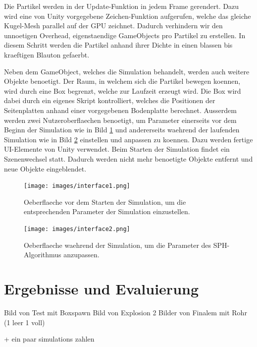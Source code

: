 \documentclass[a4paper]{paper}
\begin{document}
Die Partikel werden in der Update-Funktion in jedem Frame gerendert. Dazu wird eine von Unity vorgegebene Zeichen-Funktion aufgerufen, welche das gleiche Kugel-Mesh parallel auf der GPU zeichnet. Dadurch verhindern wir den unnoetigen Overhead, eigenstaendige GameObjects pro Partikel zu erstellen. In diesem Schritt werden die Partikel anhand ihrer Dichte in einen blassen bis kraeftigen Blauton gefaerbt.

Neben dem GameObject, welches die Simulation behandelt, werden auch weitere Objekte benoetigt. Der Raum, in welchem sich die Partikel bewegen koennen, wird durch eine Box begrenzt, welche zur Laufzeit erzeugt wird. Die Box wird dabei durch ein eigenes Skript kontrolliert, welches die Positionen der Seitenplatten anhand einer vorgegebenen Bodenplatte berechnet.
Ausserdem werden zwei Nutzeroberflaechen benoetigt, um Parameter einerseits vor dem Beginn der Simulation wie in Bild \ref{fig:interface1} und andererseits waehrend der laufenden Simulation wie in Bild \ref{fig:interface2} einstellen und anpassen zu koennen. Dazu werden fertige UI-Elemente von Unity verwendet. Beim Starten der Simulation findet ein Szenenwechsel statt. Dadurch werden nicht mehr benoetigte Objekte entfernt und neue Objekte eingeblendet.

\begin{figure}[t]
    \centering
    \texttt{[image: images/interface1.png]}
    \caption{Oeberflaeche vor dem Starten der Simulation, um die entsprechenden Parameter der Simulation einzustellen.}
    \label{fig:interface1}
\end{figure}

\begin{figure}[t]
    \centering
    \texttt{[image: images/interface2.png]}
    \caption{Oeberflaeche waehrend der Simulation, um die Parameter des SPH-Algorithmus anzupassen.}
    \label{fig:interface2}
\end{figure}

\section{Ergebnisse und Evaluierung}
Bild von Test mit Boxspawn
Bild von Explosion
2 Bilder von Finalem mit Rohr (1 leer 1 voll)

+ ein paar simulations zahlen
\end{document}
